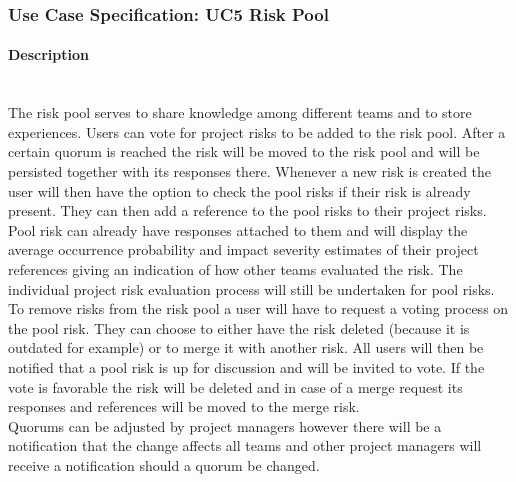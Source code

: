 
\newpage
\subsubsection{Use Case Specification: \ac{UC}5 Risk Pool}
\label{sec:domainBbf}

\paragraph*{Description}\mbox{}\\
The risk pool serves to share knowledge among different teams and to store experiences. Users can vote for project risks to be added to the risk pool. After a certain quorum is reached the risk will be moved to the risk pool and will be persisted together with its responses there. Whenever a new risk is created the user will then have the option to check the pool risks if their risk is already present. They can then add a reference to the pool risks to their project risks. Pool risk can already have responses attached to them and will display the average occurrence probability and impact severity estimates of their project references giving an indication of how other teams evaluated the risk. The individual project risk evaluation process will still be undertaken for pool risks. \\
To remove risks from the risk pool a user will have to request a voting process on the pool risk. They can choose to either have the risk deleted (because it is outdated for example) or to merge it with another risk. All users will then be notified that a pool risk is up for discussion and will be invited to vote. If the vote is favorable the risk will be deleted and in case of a merge request its responses and references will be moved to the merge risk. \\
Quorums can be adjusted by project managers however there will be a notification that the change affects all teams and other project managers will receive a notification should a quorum be changed. 

